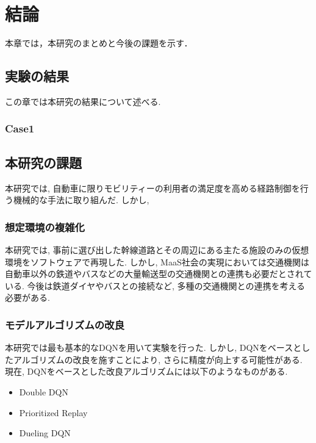 \chapter{結論}
\label{conclusion}

本章では，本研究のまとめと今後の課題を示す．

\section{実験の結果}

この章では本研究の結果について述べる.


\subsection{Case1 }

\section{本研究の課題}

本研究では, 自動車に限りモビリティーの利用者の満足度を高める経路制御を行う機械的な手法に取り組んだ.
しかし,

\subsection{想定環境の複雑化}

本研究では, 事前に選び出した幹線道路とその周辺にある主たる施設のみの仮想環境をソフトウェアで再現した. 
しかし, MaaS社会の実現においては交通機関は自動車以外の鉄道やバスなどの大量輸送型の交通機関との連携も必要だとされている.
今後は鉄道ダイヤやバスとの接続など, 多種の交通機関との連携を考える必要がある.~\cite{MaaSIntegration}

\subsection{モデルアルゴリズムの改良}

本研究では最も基本的なDQNを用いて実験を行った. しかし, DQNをベースとしたアルゴリズムの改良を施すことにより, さらに精度が向上する可能性がある.
現在, DQNをベースとした改良アルゴリズムには以下のようなものがある.


\begin{itemize}
    \item Double DQN
    \item Prioritized Replay
    \item Dueling DQN
\end{itemize}

